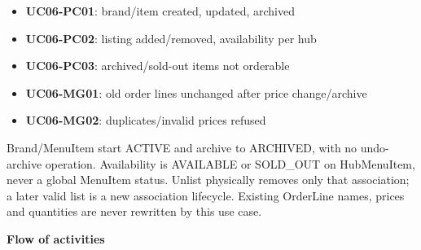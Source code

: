 \begin{itemize}
\item \textbf{UC06-PC01}: brand/item created, updated, archived

\item \textbf{UC06-PC02}: listing added/removed, availability per hub

\item \textbf{UC06-PC03}: archived/sold-out items not orderable

\item \textbf{UC06-MG01}: old order lines unchanged after price change/archive

\item \textbf{UC06-MG02}: duplicates/invalid prices refused

\end{itemize}
Brand/MenuItem start ACTIVE and archive to ARCHIVED, with no undo-archive operation. Availability is AVAILABLE or SOLD\_OUT on HubMenuItem, never a global MenuItem status. Unlist physically removes only that association; a later valid list is a new association lifecycle. Existing OrderLine names, prices and quantities are never rewritten by this use case.

\textbf{Flow of activities}

